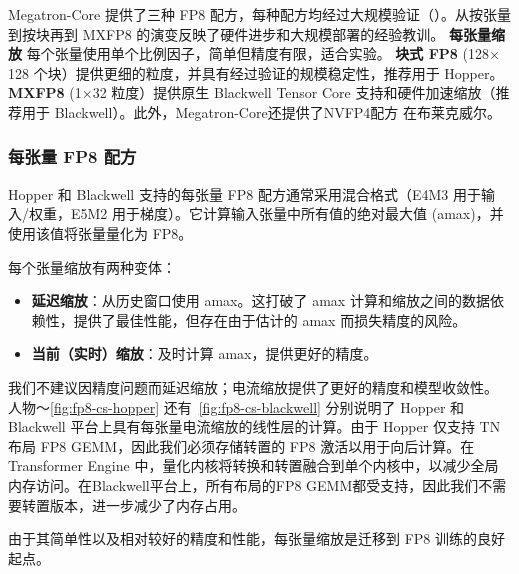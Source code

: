 \documentclass[10pt,logo,copyright]{nvidiatechreport_zh}
\begin{document}
Megatron-Core 提供了三种 FP8 配方，每种配方均经过大规模验证（）。从按张量到按块再到 MXFP8 的演变反映了硬件进步和大规模部署的经验教训。 \textbf{每张量缩放} 每个张量使用单个比例因子，简单但精度有限，适合实验。 \textbf{块式 FP8} (128$\times$128 个块）提供更细的粒度，并具有经过验证的规模稳定性，推荐用于 Hopper。 \textbf{MXFP8} (1$\times$32 粒度）提供原生 Blackwell Tensor Core 支持和硬件加速缩放（推荐用于 Blackwell）。此外，Megatron-Core还提供了NVFP4配方 \cite{nvidia2025pretraininglargelanguagemodels} 在布莱克威尔。

\subsubsection{每张量 FP8 配方}
Hopper 和 Blackwell 支持的每张量 FP8 配方通常采用混合格式（E4M3 用于输入/权重，E5M2 用于梯度）。它计算输入张量中所有值的绝对最大值 (amax)，并使用该值将张量量化为 FP8。

每个张量缩放有两种变体：
\begin{itemize}
    \item \textbf{延迟缩放}：从历史窗口使用 amax。这打破了 amax 计算和缩放之间的数据依赖性，提供了最佳性能，但存在由于估计的 amax 而损失精度的风险。
    \item \textbf{当前（实时）缩放}：及时计算 amax，提供更好的精度。
\end{itemize}

我们不建议因精度问题而延迟缩放；电流缩放提供了更好的精度和模型收敛性。
人物～\ref{fig:fp8-cs-hopper} 还有~\ref{fig:fp8-cs-blackwell} 分别说明了 Hopper 和 Blackwell 平台上具有每张量电流缩放的线性层的计算。由于 Hopper 仅支持 TN 布局 FP8 GEMM，因此我们必须存储转置的 FP8 激活以用于向后计算。在 Transformer Engine 中，量化内核将转换和转置融合到单个内核中，以减少全局内存访问。在Blackwell平台上，所有布局的FP8 GEMM都受支持，因此我们不需要转置版本，进一步减少了内存占用。

由于其简单性以及相对较好的精度和性能，每张量缩放是迁移到 FP8 训练的良好起点。
\end{document}

